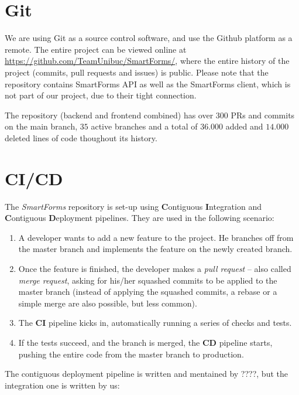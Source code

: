 \documentclass[11pt, a4paper]{report}
\begin{document}
\section{Git}

We are using Git\cite{Git} as a source control software, and use the Github platform as a remote. The entire project can be viewed online at \url{https://github.com/TeamUnibuc/SmartForms/}, where the entire history of the project (commits, pull requests and issues) is public. Please note that the repository contains SmartForms API as well as the SmartForms client, which is not part of our project, due to their tight connection.

The repository (backend and frontend combined) has over $300$ PRs and commits on the main branch, $35$ active branches and a total of $36.000$ added and $14.000$ deleted lines of code thoughout its history. 


\section{CI/CD}

The \textit{SmartForms} repository is set-up using \textbf{C}ontiguous \textbf{I}ntegration and \textbf{C}ontiguous \textbf{D}eployment pipelines. They are used in the following scenario:
\begin{enumerate}
	\item A developer wants to add a new feature to the project. He branches off from the master branch and implements the feature on the newly created branch.
	\item Once the feature is finished, the developer makes a \textit{pull request} -- also called \textit{merge request}, asking for his/her squashed commits to be applied to the master branch (instead of applying the squashed commits, a rebase or a simple merge are also possible, but less common).
	\item The \textbf{CI} pipeline kicks in, automatically running a series of checks and tests.
	\item If the tests succeed, and the branch is merged, the \textbf{CD} pipeline starts, pushing the entire code from the master branch to production.
\end{enumerate}

The contiguous deployment pipeline is written and mentained by ????\cite{felix}, but the integration one is written by us:
\end{document}
